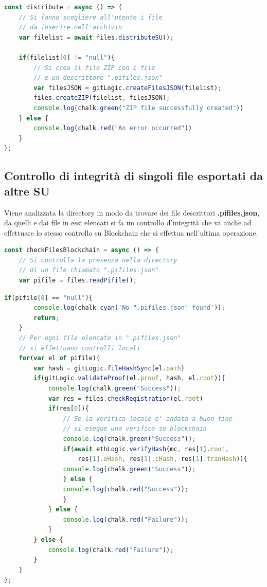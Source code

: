 \begin{lstlisting}[language=JavaScript]
const distribute = async () => {
    // Si fanno scegliere all'utente i file
    // da inserire nell'archivio
    var filelist = await files.distributeSU();
    
    if(filelist[0] != "null"){
        // Si crea il file ZIP con i file
        // e un descrittore ".pifiles.json"
        var filesJSON = gitLogic.createFilesJSON(filelist);
        files.createZIP(filelist, filesJSON);
        console.log(chalk.green("ZIP file successfully created"))
    } else {
        console.log(chalk.red("An error occurred"))
    }
};
\end{lstlisting}

\subsection{Controllo di integrità di singoli file esportati da altre SU}
Viene analizzata la directory in modo da trovare dei file descrittori \textbf{.pifiles.json}, da quelli e dai file in essi elencati si fa un controllo d’integrità che va anche ad effettuare lo stesso controllo su Blockchain che si effettua nell’ultima operazione.

\begin{lstlisting}[language=JavaScript]
const checkFilesBlockchain = async () => {
    // Si controlla la presenza nella directory
    // di un file chiamato ".pifiles.json"
    var pifile = files.readPifile();
\end{lstlisting}
\newpage
\begin{lstlisting}[language=JavaScript, firstnumber=5]
    if(pifile[0] == "null"){
        console.log(chalk.cyan('No ".pifiles.json" found'));
        return;
    }
    // Per ogni file elencato in ".pifiles.json"
    // si effettuano controlli locali
    for(var el of pifile){
        var hash = gitLogic.fileHashSync(el.path)
        if(gitLogic.validateProof(el.proof, hash, el.root)){
            console.log(chalk.green("Success"));
            var res = files.checkRegistration(el.root)
            if(res[0]){
                // Se la verifica locale e' andata a buon fine
                // si esegue una verifica su blockchain
                console.log(chalk.green("Success"));
                if(await ethLogic.verifyHash(mc, res[1].root,
                    res[1].oHash, res[1].cHash, res[1].tranHash)){
                console.log(chalk.green("Success"));
                } else {
                console.log(chalk.red("Success"));
                }
            } else {
                console.log(chalk.red("Failure"));
            }
        } else {
            console.log(chalk.red("Failure"));
        }
    }
};
\end{lstlisting}

